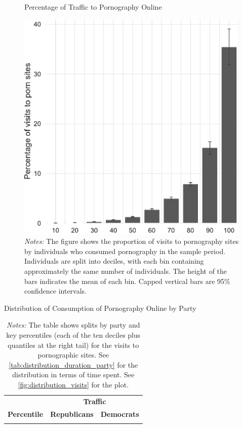 \documentclass[12pt, letterpaper]{article}
\begin{document}
\begin{figure}
	\centering
	\caption{Percentage of Traffic to Pornography Online}
	\includegraphics[width=.5\linewidth]{figs/distribution_proportion_visits_to_adultsites.pdf}
	\caption*{\footnotesize \emph{Notes:} 
		The figure shows the proportion of visits to pornography sites by individuals who consumed pornography in the sample period.
		Individuals are split into deciles, with each bin containing approximately the same number of individuals.
		The height of the bars indicates the mean of each bin.
		Capped vertical bars are 95\% confidence intervals.
	}
	\label{fig:distribution_prop_visits}
\end{figure}


\begin{table}[ht] \centering \small \setlength\tabcolsep{10 pt}
	\caption{Distribution of Consumption of Pornography Online by Party}
	\label{tab:distribution_visits_party}
	\begin{adjustbox}{max width=\textwidth}
		\begin{tabular}{crr}
			\toprule
			\multicolumn{1}{l}{\textbf{}}&\multicolumn{2}{c}{\textbf{Traffic}}\\
			\cmidrule(l){2-3}
			\multicolumn{1}{l}{\textbf{Percentile}}&\multicolumn{1}{c}{\textbf{Republicans}}&\multicolumn{1}{c}{\textbf{Democrats}}\\
			\midrule
            \\
			\bottomrule
		\end{tabular}
	\end{adjustbox}
	\caption*{\footnotesize \emph{Notes:} 
		The table shows splits by party and key percentiles (each of the ten deciles plus quantiles at the right tail) for the visits to pornographic sites.
		See \cref{tab:distribution_duration_party} for the distribution in terms of time spent. 
		See \cref{fig:distribution_visits} for the plot.
	}
\end{table}
\end{document}
